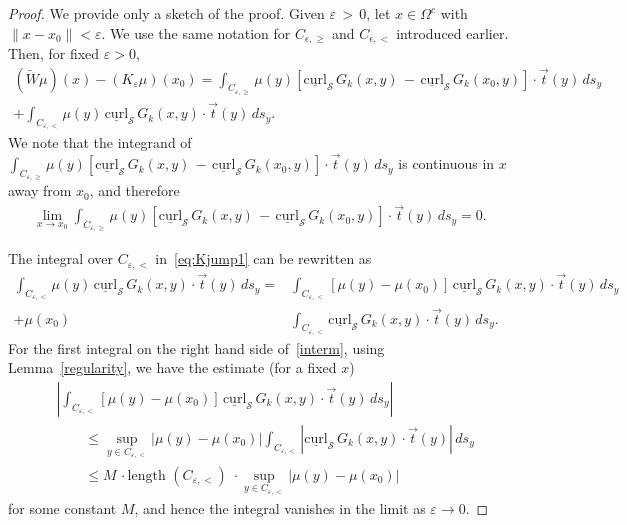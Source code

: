 \documentclass[final]{siamltex}
\renewcommand{\S} {\mathcal{S}}
\newcommand{\e}{\varepsilon}
\begin{document}
\begin{proof}
We provide only a sketch of the proof.  Given $\varepsilon \, > \,0$,
let $x\in \Omega^{c}$ with $ \| x-x_0\|<\varepsilon$.   We use the same
notation for $C_{\epsilon,\geq}$ and $C_{\epsilon,<}$ introduced
earlier.  Then, for fixed $\e>0$, 
\begin{align}
  (\widetilde{W}\mu)(x)-(K_{\varepsilon} \mu)(x_0) = 
  \int_{C_{\e,\geq}}\mu(y)\left[\underline{\mbox{curl}}_{\S}\, 
  G_{k}(x,y)\,-\,\underline{\mbox{curl}}_{\S}\,G_k(x_{0},y)
  \right]\cdot\vec{t}(y)\, ds_{y} \nonumber\\
  +\int_{C_{\e,<}} \mu(y)\,\underline{\mbox{curl}}_{\S}\,
  G_k(x,y)\cdot\vec{t}(y)\,ds_{y}.
  \label{eq:Kjump1}
\end{align}
We note that the integrand of $\int_{C_{\e,\geq}} \mu(y)
\left[\underline{\mbox{curl}}_{\S}\,
G_k(x,y)\,-\,\underline{\mbox{curl}}_{\S}\,G_k(x_0,y)\right]\cdot\vec{t}(y)\,
ds_{y}$ is continuous in $x$ away from  $x_0$, and therefore 
\begin{align*}
  \lim_{x\rightarrow x_0}  \int_{C_{\e,\geq}}
  \mu(y)\left[\underline{\mbox{curl}}_{\S}\,
  G_{k}(x,y)\,-\,\underline{\mbox{curl}}_{\S}\,
  G_{k}(x_{0},y)\right]\cdot\vec{t}(y)\,ds_{y} = 0.
\end{align*}

The integral over $C_{\e,<}$ in~\eqref{eq:Kjump1} can be rewritten as
\begin{align}
  \int_{C_{\e,<}} \mu(y)\,\underline{\mbox{curl}}_{\S}\,
    G_k(x,y)\cdot\vec{t}(y)\,ds_{y} 
  = &\int_{C_{\e,<}} \left[\mu(y)-\mu(x_0)\right]\,
    \underline{\mbox{curl}}_{\S}\,G_k(x,y)\cdot\vec{t}(y)\,ds_{y}
    \nonumber \\
  + \mu(x_0)&\int_{C_{\e,<}} \underline{\mbox{curl}}_{\S}\,
    G_k(x,y)\cdot\vec{t}(y)\,ds_{y}.
  \label{interm}
\end{align}
For the first integral on the right hand side of~\eqref{interm}, using
Lemma~\ref{regularity}, we have the estimate (for a fixed $x$)
\begin{align*}
  &\left|\int_{C_{\e,<}} \left[\mu(y)-\mu(x_0)\right]\,
    \underline{\mbox{curl}}_{\S}\,G_k(x,y)\cdot\vec{t}(y)\,ds_{y}\right| \\
  &\qquad \leq \sup_{y \in C_{\e,<}} |\mu(y)-\mu(x_0)|
    \int_{C_{\e,<}} \left|\underline{\mbox{curl}}_{\S}\,
    G_k(x,y)\cdot\vec{t}(y)\right|\,ds_{y}\\
  &\qquad \leq M\,\cdot \mbox{length $(C_{\e,<})$}\;
    \cdot \sup_{y \in C_{\e,<}} |\mu(y)-\mu(x_0)|
\end{align*}
for some constant $M$, and hence the integral vanishes in the limit as
$\varepsilon\longrightarrow 0$.


\end{proof}
\end{document}
